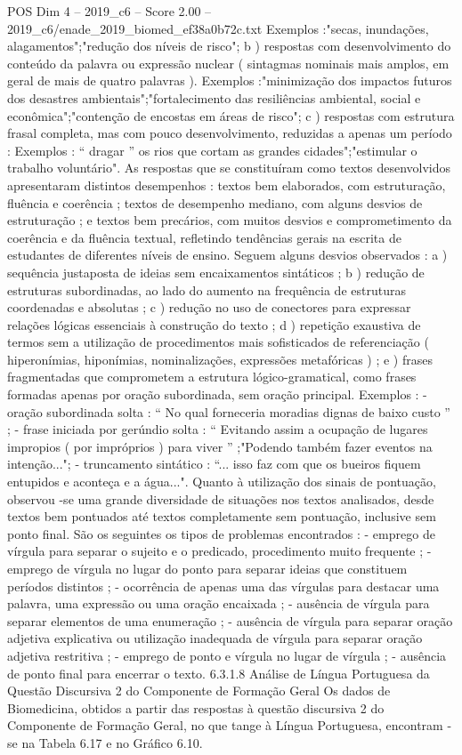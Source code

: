 \begin{textsample}{POS Dim 4 – 2019\_c6 – Score 2.00 – 2019\_c6/enade\_2019\_biomed\_ef38a0b72c.txt}
Exemplos :"secas, inundações, alagamentos";"redução dos níveis de risco"; b ) respostas com desenvolvimento do conteúdo da palavra ou expressão nuclear ( sintagmas nominais mais amplos, em geral de mais de quatro palavras ).
Exemplos :"minimização dos impactos futuros dos desastres ambientais";"fortalecimento das resiliências ambiental, social e econômica";"contenção de encostas em áreas de risco"; c ) respostas com estrutura frasal completa, mas com pouco desenvolvimento, reduzidas a apenas um período : Exemplos : “ dragar ” os rios que cortam as grandes cidades";"estimular o trabalho voluntário".
As respostas que se constituíram como textos desenvolvidos apresentaram distintos desempenhos : textos bem elaborados, com estruturação, fluência e coerência ; textos de desempenho mediano, com alguns desvios de estruturação ; e textos bem precários, com muitos desvios e comprometimento da coerência e da fluência textual, refletindo tendências gerais na escrita de estudantes de diferentes níveis de ensino.
Seguem alguns desvios observados : a ) sequência justaposta de ideias sem encaixamentos sintáticos ; b ) redução de estruturas subordinadas, ao lado do aumento na frequência de estruturas coordenadas e absolutas ; c ) redução no uso de conectores para expressar relações lógicas essenciais à construção do texto ; d ) repetição exaustiva de termos sem a utilização de procedimentos mais sofisticados de referenciação ( hiperonímias, hiponímias, nominalizações, expressões metafóricas ) ; e ) frases fragmentadas que comprometem a estrutura lógico-gramatical, como frases formadas apenas por oração subordinada, sem oração principal.
Exemplos : - oração subordinada solta : “ No qual forneceria moradias dignas de baixo custo ” ; - frase iniciada por gerúndio solta : “ Evitando assim a ocupação de lugares impropios ( por impróprios ) para viver ” ;"Podendo também fazer eventos na intenção..."; - truncamento sintático : “... isso faz com que os bueiros fiquem entupidos e aconteça e a água...".
Quanto à utilização dos sinais de pontuação, observou -se uma grande diversidade de situações nos textos analisados, desde textos bem pontuados até textos completamente sem pontuação, inclusive sem ponto final.
São os seguintes os tipos de problemas encontrados : - emprego de vírgula para separar o sujeito e o predicado, procedimento muito frequente ; - emprego de vírgula no lugar do ponto para separar ideias que constituem períodos distintos ; - ocorrência de apenas uma das vírgulas para destacar uma palavra, uma expressão ou uma oração encaixada ; - ausência de vírgula para separar elementos de uma enumeração ; - ausência de vírgula para separar oração adjetiva explicativa ou utilização inadequada de vírgula para separar oração adjetiva restritiva ; - emprego de ponto e vírgula no lugar de vírgula ; - ausência de ponto final para encerrar o texto. 6.3.1.8 Análise de Língua Portuguesa da Questão Discursiva 2 do Componente de Formação Geral Os dados de Biomedicina, obtidos a partir das respostas à questão discursiva 2 do Componente de Formação Geral, no que tange à Língua Portuguesa, encontram -se na Tabela 6.17 e no Gráfico 6.10.

\end{textsample}
